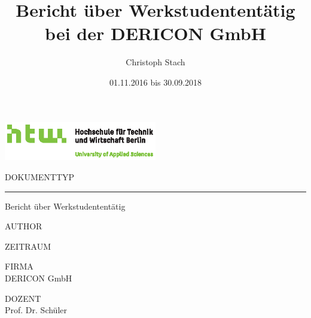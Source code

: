 \documentclass[chapterprefix=false, 12pt, a4paper, oneside, parskip=half, listof=totoc, bibliography=totoc, numbers=noendperiod]{scrbook}
\title{Bericht über Werkstudententätig bei der DERICON GmbH}
\author{Christoph Stach}
\date{01.11.2016 bis 30.09.2018}
\begin{document}
    \begin{titlepage}
        \includegraphics[width=0.50\textwidth]{img/Q01_HTW_Berlin_Logo_quer_pos_FARBIG_CMYK.eps}

        \vspace{4.0cm}

        \begin{changemargin}{0.5cm}{0.0cm}
            \color{htwgrau}
            \normalsize
            \textsf{\noindent\MakeUppercase{Dokumenttyp}} \vspace{-20pt}\\
            \noindent\rule{\textwidth}{0.5pt}\vspace{-4pt}
            \color{black}
            \huge
            \textsf{Bericht über Werkstudententätig}
            \vspace{12pt}

            \color{htwgrau}
            \normalsize
            \textsf{\MakeUppercase{Author}}\\
            \color{black}
            \large
            \textsf{\theauthor}

            \color{htwgrau}
            \normalsize
            \textsf{\MakeUppercase{Zeitraum}}\\
            \color{black}
            \large
            \textsf{\thedate}

            \vfill

            \color{htwgrau}
            \normalsize
            \textsf{\MakeUppercase{Firma}}\\
            \color{black}
            \large
            \textsf{DERICON GmbH}

            \color{htwgrau}
            \normalsize
            \textsf{\MakeUppercase{Dozent}}\\
            \color{black}
            \large
            \textsf{Prof. Dr. Schüler}
            \vspace{-60pt}
        \end{changemargin}
    \end{titlepage}
\end{document}
